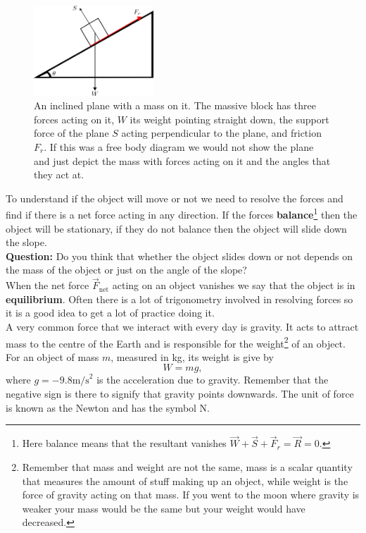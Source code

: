 \documentclass[a4paper,12pt]{book}
\begin{document}
\begin{figure}[ht]
    \centering
   \includegraphics[width=0.4\textwidth]{figures/inclined_plane.png}
    \caption{An inclined plane with a mass on it. The massive block has three forces acting on it, $W$ its weight pointing straight down, the support force of the plane $S$ acting perpendicular to the plane, and friction $F_{r}$. If this was a free body diagram we would not show the plane and just depict the mass with forces acting on it and the angles that they act at.}
\end{figure}

To understand if the object will move or not we need to resolve the forces and find if there is a net force acting in any direction. If the forces \textbf{balance}\footnote{Here balance means that the resultant vanishes $\vec{W}+\vec{S}+\vec{F}_{r}=\vec{R}=0$.} then the object will be stationary, if they do not balance then the object will slide down the slope. \\


\textbf{Question:} Do you think that whether the object slides down or not depends on the mass of the object or just on the angle of the slope?\\


When the net force $\vec{F}_{\text{net}}$ acting on an object vanishes we say that the object is in \textbf{equilibrium}. Often there is a lot of trigonometry involved in resolving forces so it is a good idea to get a lot of practice doing it.\\

A very common force that we interact with every day is gravity. It acts to attract mass to the centre of the Earth and is responsible for the weight\footnote{Remember that mass and weight are not the same, mass is a scalar quantity that measures the amount of stuff making up an object, while weight is the force of gravity acting on that mass. If you went to the moon where gravity is weaker your mass would be the same but your weight would have decreased.} of an object. For an object of mass $m$, measured in kg, its weight is give by
\begin{equation}
W=mg,
\end{equation}
where $g=-9.8\text{m/s}^{2}$ is the acceleration due to gravity. Remember that the negative sign is there to signify that gravity points downwards. The unit of force is known as the Newton and has the symbol N. \\
\end{document}
